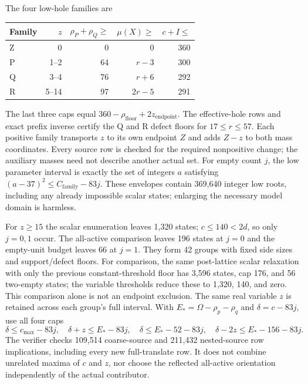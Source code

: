 \documentclass[11pt,a4paper]{article}
\begin{document}
The four low-hole families are
\begin{center}\small
\begin{tabular}{lrrrr}\toprule
Family&$z$&$\rho_P+\rho_Q\ge$&$\mu(X)\ge$&$c+I\le$\\\midrule
Z&0&0&0&360\\
P&1--2&64&$r-3$&300\\
Q&3--4&76&$r+6$&292\\
R&5--14&97&$2r-5$&291\\\bottomrule
\end{tabular}
\end{center}
The last three caps equal $360-\rho_{
\mathrm{floor}}+2z_{
\mathrm{endpoint}}$.
The effective-hole rows and exact prefix inverse certify the Q and R
defect floors for $17\le r\le57$. Each positive family transports
$z$ to its own endpoint $Z$ and adds $Z-z$ to both mass coordinates.
Every source row is checked for the required nonpositive change;
the auxiliary masses need not describe another actual set.
For empty count $j$, the low parameter interval is exactly the set of
integers $a$ satisfying $(a-37)^2\le C_{
\mathrm{family}}-83j$.
These envelopes contain 369,640 integer low roots, including any
already impossible scalar states; enlarging the necessary model domain
is harmless.

For $z\ge15$ the scalar enumeration leaves 1,320 states; $c\le140<2d$,
so only $j=0,1$ occur. The all-active comparison leaves 196 states
at $j=0$ and the empty-unit budget leaves 66 at $j=1$.
They form 42 groups with fixed side sizes and support/defect floors.
For comparison, the same post-lattice scalar relaxation with only the
previous constant-threshold floor has 3,596 states, cap 176, and 56
two-empty states; the variable thresholds reduce these to 1,320, 140,
and zero. This comparison alone is not an endpoint exclusion.
The same real variable $z$ is retained across each group's full interval.
With $E_*=\Omega-\rho_p-\rho_q$ and $\delta=c-83j$, use all four caps
\[
 \delta\le c_{\max}-83j,\quad
 \delta+z\le E_*-83j,\quad
 \delta\le E_*-52-83j,\quad
 \delta-2z\le E_*-156-83j.
\]
The verifier checks 109,514 coarse-source and 211,432 nested-source
row implications, including every new full-translate row.
It does not combine unrelated maxima of $c$ and $z$, nor choose the
reflected all-active orientation independently of the actual contributor.
\end{document}
